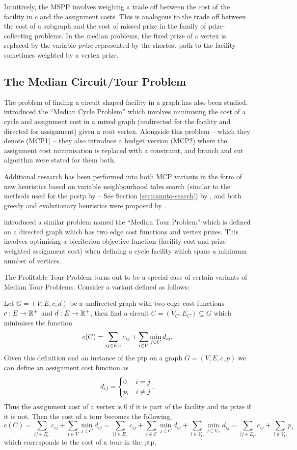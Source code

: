  Intuitively, the MSPP involves weighing a trade off between the cost of the facility
 in $c$ and the assignment costs. 
 This is analogous to the trade off between the cost of a subgraph and the cost of missed prize in the
 family of prize-collecting problems. In the median problems, the fixed prize of a vertex is
 replaced by the variable \textit{prize} represented by the shortest path to the facility sometimes weighted
 by a vertex prize.
 \subsection{The Median Circuit/Tour Problem}
 The problem of finding a circuit shaped facility in a graph has also been studied.
 \citet{labbe1999themedian} introduced the ``Median Cycle Problem'' which involves
 minimising the cost of a cycle and assignment cost in a mixed graph (undirected for
 the facility and directed for assignment) given a root vertex. Alongside this problem
 -- which they denote (MCP1) -- they also introduce a budget version (MCP2) where the
 assignment cost minimisation is replaced with a constraint, and branch and cut algorithm
 were stated for them both.

 Additional research has been performed into both MCP variants
 in the form of new heuristics based on variable neighbourhood tabu search
 (similar to the methods used for the \gls{pcstp} by \citet{canuto2001local} --
 See Section \ref{sec:canuto-search}) by \citet{perez2003variable}, and both
 greedy and evolutionary heuristics were proposed by \citet{renaud2004efficient}.
 
 \citet{current1994median} introduced a similar problem named the ``Median Tour Problem''
 which is defined on a directed graph which has two edge cost functions and vertex prizes.
 This involves optimising a bicriterion objective function
 (facility cost and prize-weighted assignment cost)
 when defining a cycle facility which spans a minimum number of vertices.

 The Profitable Tour Problem turns out to be a special case of certain variants of Median
 Tour Problems. Consider a variant defined as follows:
 
 Let $G = (V, E, c, d)$ be a undirected graph with two edge cost functions
 $c : E \to \mathbb{R}^+$ and $d : E \to \mathbb{R}^+$, then find a circuit $C = (V_C, E_C) \subseteq G$
 which minimises
 the function
 \[c(C) = \sum_{ij \in E_C} c_{ij} + \sum_{i \in V} \min_{j \in C} d_{ij} \mathnormal{.}\]
 Given this definition and an instance of the \gls{ptp} on a graph $G = (V, E, c, p)$
 we can define an assignment cost function as
 $$d_{ij} =
 \begin{cases}
   0 & i = j \\
   p_i & i \neq j
 \end{cases}\mathnormal{.}
 $$
 Thus the assignment cost of a vertex is 0 if it is part of the facility and its prize
 if it is not. Then the cost of a tour becomes the following,
 $$c(C) = \sum_{ij \in E_C} c_{ij} + \sum_{i \in V} \min_{j \in C} d_{ij} =
 \sum_{ij \in E_C} c_{ij} + \sum_{i \not\in C} \min_{j \in C} d_{ij} + \sum_{i \in V_C} \min_{j \in V_C} d_{ij}
 = \sum_{ij \in E_C} c_{ij} + \sum_{i \not\in V_C}  p_i$$
 which corresponds to the cost of a tour in the \gls{ptp}.

